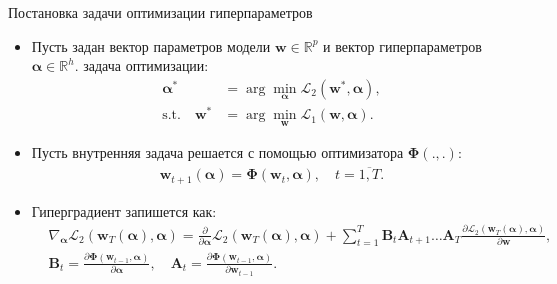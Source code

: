 \documentclass[aspectratio=169]{beamer}
\begin{document}
\begin{frame}{Постановка задачи оптимизации гиперпараметров}
\begin{itemize}
  \item Пусть задан вектор параметров модели $\mathbf{w} \in \mathbb{R}^p$ и вектор гиперпараметров
  $\boldsymbol{\alpha} \in \mathbb{R}^h$. задача оптимизации:
  \begin{align*}
    \boldsymbol{\alpha}^* &= \arg\min_{\boldsymbol{\alpha}}\mathcal{L}_2(\mathbf{w}^*, \boldsymbol{\alpha}), \\
    \mathrm{s.t.} \quad \mathbf{w}^* &= \arg\min_{\mathbf{w}}\mathcal{L}_1(\mathbf{w}, \boldsymbol{\alpha}).
  \end{align*}
  \item Пусть внутренняя задача решается с помощью оптимизатора $\mathbf{\Phi}(., .)$:
  \begin{align*}
    \mathbf{w}_{t + 1}(\boldsymbol{\alpha}) = \mathbf{\Phi}(\mathbf{w}_t, \boldsymbol{\alpha}), \quad
    t = \overline{1, T}.
  \end{align*}
  \item Гиперградиент запишется как:
  \begin{align*}
    &\nabla_{\boldsymbol{\alpha}}\mathcal{L}_2(\mathbf{w}_T(\boldsymbol{\alpha}), \boldsymbol{\alpha}) = 
    \frac{\partial}{\partial \boldsymbol{\alpha}}\mathcal{L}_2(\mathbf{w}_T(\boldsymbol{\alpha}), \boldsymbol{\alpha}) + 
    \sum_{t=1}^T\mathbf{B}_t\mathbf{A}_{t+1}\ldots\mathbf{A}_T
    \frac{\partial \mathcal{L}_2(\mathbf{w}_T(\boldsymbol{\alpha}), \boldsymbol{\alpha})}{\partial\mathbf{w}}, \\
    &\mathbf{B}_t = \frac{\partial\mathbf{\Phi}(\mathbf{w}_{t-1}, \boldsymbol{\alpha})}{\partial\boldsymbol{\alpha}},
    \quad \mathbf{A}_t = \frac{\partial\mathbf{\Phi}(\mathbf{w}_{t-1}, \boldsymbol{\alpha})}{\partial\boldsymbol{w}_{t - 1}}.
  \end{align*}
\end{itemize}
\end{frame}
\end{document}
